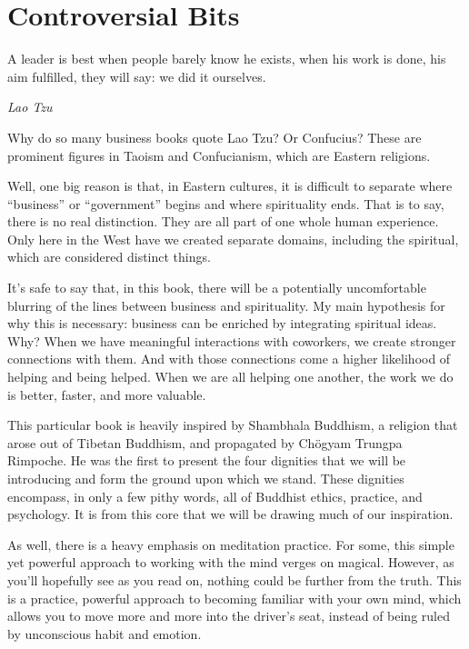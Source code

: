 \chapter{Controversial Bits}
\epigraph{A leader is best when people barely know he exists, when his work is done, his aim fulfilled, they will say: we did it ourselves.}{\textit{Lao Tzu}}

Why do so many business books quote Lao Tzu? Or Confucius? These are prominent figures in Taoism
and Confucianism, which are Eastern religions.

Well, one big reason is that, in Eastern cultures, it is difficult to separate where ``business'' or ``government''
begins and where spirituality ends. That is to say, there is no real distinction. They are all part of one whole 
human experience. Only here in the West have we created separate domains, including the spiritual, which 
are considered distinct things.

It's safe to say that, in this book, there will be a potentially uncomfortable blurring of the lines between business
and spirituality. My main hypothesis for why this is necessary: business can be enriched by integrating spiritual
ideas. Why? When we have meaningful interactions with coworkers, we create stronger connections with them.
And with those connections come a higher likelihood of helping and being helped. When we are all helping
one another, the work we do is better, faster, and more valuable.

This particular book is heavily inspired by Shambhala Buddhism, a religion that arose out of Tibetan Buddhism,
and propagated by Ch{\"o}gyam Trungpa Rimpoche. He was the first to present the four dignities that we will be
introducing and form the ground upon which we stand. These dignities encompass, in only a few 
pithy words, all of Buddhist ethics, practice, and psychology. It is from this core that we will be drawing
much of our inspiration.

As well, there is a heavy emphasis on meditation practice. For some, this simple yet powerful approach to 
working with the mind verges on magical. However, as you'll hopefully see as you read on, nothing
could be further from the truth. This is a practice, powerful approach to becoming familiar with your own
mind, which allows you to move more and more into the driver's seat, instead of being ruled by unconscious
habit and emotion.